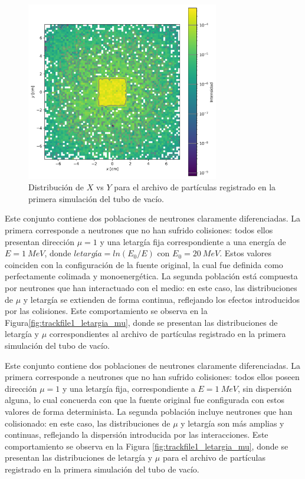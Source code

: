 \begin{figure}[H]
    \centering
    \includegraphics[width=0.75\textwidth]{figs/fig4_1.png}
    \caption{Distribución de $X$ vs $Y$ para el archivo de partículas registrado en la primera simulación del tubo de vacío.}
    \label{fig:trackfile1_x_y}
\end{figure}

Este conjunto contiene dos poblaciones de neutrones claramente diferenciadas. La primera corresponde a neutrones que no han sufrido colisiones: todos ellos presentan dirección $\mu = 1$ y una letargía fija correspondiente a una energía de $E = 1~MeV$, donde $\textit{letargía} = ln(E_0/E)$ con $E_0 = 20~MeV$. Estos valores coinciden con la configuración de la fuente original, la cual fue definida como perfectamente colimada y monoenergética. La segunda población está compuesta por neutrones que han interactuado con el medio: en este caso, las distribuciones de $\mu$ y letargía se extienden de forma continua, reflejando los efectos introducidos por las colisiones. Este comportamiento se observa en la Figura\ref{fig:trackfile1_letargia_mu}, donde se presentan las distribuciones de letargía y $\mu$ correspondientes al archivo de partículas registrado en la primera simulación del tubo de vacío.

Este conjunto contiene dos poblaciones de neutrones claramente diferenciadas. La primera corresponde a neutrones que no han sufrido colisiones: todos ellos poseen dirección $\mu = 1$ y una letargía fija, correspondiente a $E = 1~MeV$, sin dispersión alguna, lo cual concuerda con que la fuente original fue configurada con estos valores de forma determinista. La segunda población incluye neutrones que han colisionado: en este caso, las distribuciones de $\mu$ y letargía son más amplias y continuas, reflejando la dispersión introducida por las interacciones. Este comportamiento se observa en la Figura \ref{fig:trackfile1_letargia_mu}, donde se presentan las distribuciones de letargía y $\mu$ para el archivo de partículas registrado en la primera simulación del tubo de vacío. 

